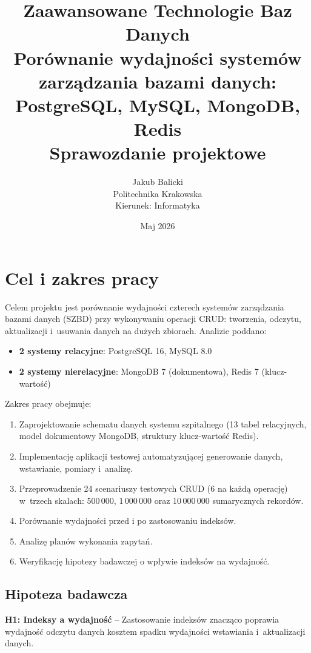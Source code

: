 \documentclass[12pt,a4paper]{article}
\title{
    \vspace{-1cm}
    \Large\textbf{Zaawansowane Technologie Baz Danych}\\[0.3cm]
    \large Porównanie wydajności systemów zarządzania bazami danych:\\
    PostgreSQL, MySQL, MongoDB, Redis\\[0.5cm]
    \normalsize Sprawozdanie projektowe
}
\author{
    Jakub Balicki\\[0.2cm]
    Politechnika Krakowska\\
    Kierunek: Informatyka
}
\date{Maj 2026}
\begin{document}
\maketitle
\thispagestyle{empty}
\newpage
\tableofcontents
\newpage

\section{Cel i zakres pracy}

Celem projektu jest porównanie wydajności czterech systemów zarządzania bazami danych (SZBD) przy wykonywaniu operacji CRUD: tworzenia, odczytu, aktualizacji i~usuwania danych na dużych zbiorach. Analizie poddano:

\begin{itemize}[noitemsep]
    \item \textbf{2 systemy relacyjne}: PostgreSQL 16, MySQL 8.0
    \item \textbf{2 systemy nierelacyjne}: MongoDB 7 (dokumentowa), Redis 7 (klucz-wartość)
\end{itemize}

Zakres pracy obejmuje:
\begin{enumerate}[noitemsep]
    \item Zaprojektowanie schematu danych systemu szpitalnego (13 tabel relacyjnych, model dokumentowy MongoDB, struktury klucz-wartość Redis).
    \item Implementację aplikacji testowej automatyzującej generowanie danych, wstawianie, pomiary i~analizę.
    \item Przeprowadzenie 24 scenariuszy testowych CRUD (6 na każdą operację) w~trzech skalach: 500\,000, 1\,000\,000 oraz 10\,000\,000 sumarycznych rekordów.
    \item Porównanie wydajności przed i po zastosowaniu indeksów.
    \item Analizę planów wykonania zapytań.
    \item Weryfikację hipotezy badawczej o wpływie indeksów na wydajność.
\end{enumerate}

\subsection{Hipoteza badawcza}

\textbf{H1: Indeksy a wydajność} -- Zastosowanie indeksów znacząco poprawia wydajność odczytu danych kosztem spadku wydajności wstawiania i~aktualizacji danych.
\end{document}
